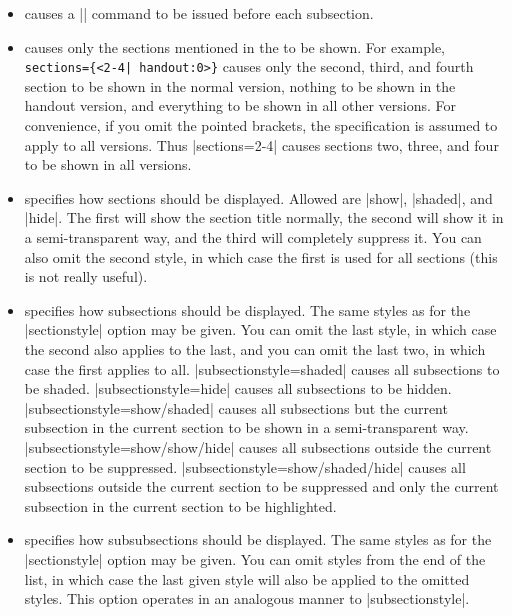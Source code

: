 \begin{command}{\tableofcontents{}}
\begin{itemize}
  \item
     causes a |\pause| command to be issued before each subsection.
  \item
     causes only the sections mentioned in the  to be shown. For example, \verb/sections={<2-4| handout:0>}/ causes only the second, third, and fourth section to be shown in the normal version, nothing to be shown in the handout version, and everything to be shown in all other versions. For convenience, if you omit the pointed brackets, the specification is assumed to apply to all versions. Thus |sections={2-4}| causes sections two, three, and four to be shown in all versions.
  \item
     specifies how sections should be displayed. Allowed  are |show|, |shaded|, and |hide|. The first will show the section title normally, the second will show it in a semi-transparent way, and the third will completely suppress it. You can also omit the second style, in which case the first is used for all sections (this is not really useful).
  \item
     specifies how subsections should be displayed. The same styles as for the |sectionstyle| option may be given. You can omit the last style, in which case the second also applies to the last, and you can omit the last two, in which case the first applies to all.
    \example
    |subsectionstyle=shaded| causes all subsections to be shaded.
    \example
    |subsectionstyle=hide| causes all subsections to be hidden.
    \example
    |subsectionstyle=show/shaded| causes all subsections but the current subsection in the current section to be shown in a semi-transparent way.
    \example
    |subsectionstyle=show/show/hide| causes all subsections outside the current section to be suppressed.
    \example
    |subsectionstyle=show/shaded/hide| causes all subsections outside the current section to be suppressed and only the current subsection in the current section to be highlighted.
  \item
     specifies how subsubsections should be displayed. 
    The same styles as for the |sectionstyle| option may be given. You can omit styles from the end of the list, in which case the last given style will also be applied to the omitted styles.
    This option operates in an analogous manner to |subsectionstyle|.
  \end{itemize}


\end{command}

